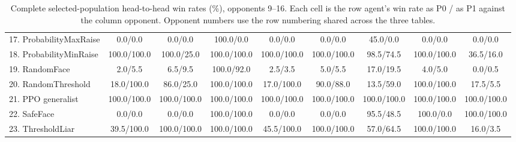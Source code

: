 \begin{table}[!ht]
{\begin{tabular}{lcccccccc}
17. ProbabilityMaxRaise & 0.0/0.0 & 0.0/0.0 & 100.0/0.0 & 0.0/0.0 & 0.0/0.0 & 45.0/0.0 & 0.0/0.0 & 0.0/0.0 \\
18. ProbabilityMinRaise & 100.0/100.0 & 100.0/25.0 & 100.0/100.0 & 100.0/100.0 & 100.0/100.0 & 98.5/74.5 & 100.0/100.0 & 36.5/16.0 \\
19. RandomFace & 2.0/5.5 & 6.5/9.5 & 100.0/92.0 & 2.5/3.5 & 5.0/5.5 & 17.0/19.5 & 4.0/5.0 & 0.0/0.5 \\
20. RandomThreshold & 18.0/100.0 & 86.0/25.0 & 100.0/100.0 & 17.0/100.0 & 90.0/88.0 & 13.5/59.0 & 100.0/100.0 & 17.5/5.5 \\
21. PPO generalist & 100.0/100.0 & 100.0/100.0 & 100.0/100.0 & 100.0/100.0 & 100.0/100.0 & 100.0/100.0 & 100.0/100.0 & 100.0/100.0 \\
22. SafeFace & 0.0/0.0 & 0.0/0.0 & 100.0/100.0 & 0.0/0.0 & 0.0/0.0 & 95.5/48.5 & 100.0/0.0 & 100.0/100.0 \\
23. ThresholdLiar & 39.5/100.0 & 100.0/100.0 & 100.0/100.0 & 45.5/100.0 & 100.0/100.0 & 57.0/64.5 & 100.0/100.0 & 16.0/3.5 \\
\bottomrule
\end{tabular}}
\caption{Complete selected-population head-to-head win rates (\%), opponents 9--16. Each cell is the row agent's win rate as P0 / as P1 against the column opponent. Opponent numbers use the row numbering shared across the three tables.}
\end{table}
\clearpage

